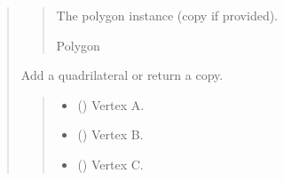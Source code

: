 \documentclass[letterpaper,10pt,english]{sphinxmanual}
\begin{document}
\begin{quote}
\begin{fulllineitems}
\begin{fulllineitems}
\begin{quote}
\begin{description}
\sphinxAtStartPar
The polygon instance (copy if provided).

\sphinxAtStartPar
Polygon

\end{description}\end{quote}

\end{fulllineitems}


\begin{fulllineitems}
\label{\detokenize{pygeox:pygeox.add_objects.AddNamespace.quadrilateral}}
\pysigstartsignatures
\pysiglinewithargsret
{}
{\sphinxparamcomma {}\sphinxparamcomma {}\sphinxparamcomma {}\sphinxparamcomma {}\sphinxparamcomma {}\sphinxparamcomma {}}
{}
\pysigstopsignatures
\sphinxAtStartPar
Add a quadrilateral or return a copy.
\begin{quote}\begin{description}
\begin{itemize}
\item {} 
\sphinxAtStartPar
{} (\sphinxstyleliteralemphasis{\sphinxupquote{ | }}) \textendash{} Vertex A.

\item {} 
\sphinxAtStartPar
{} (\sphinxstyleliteralemphasis{\sphinxupquote{ | }}) \textendash{} Vertex B.

\item {} 
\sphinxAtStartPar
{} (\sphinxstyleliteralemphasis{\sphinxupquote{ | }}) \textendash{} Vertex C.


\end{itemize}
\end{description}
\end{quote}
\end{fulllineitems}
\end{fulllineitems}
\end{quote}
\end{document}
